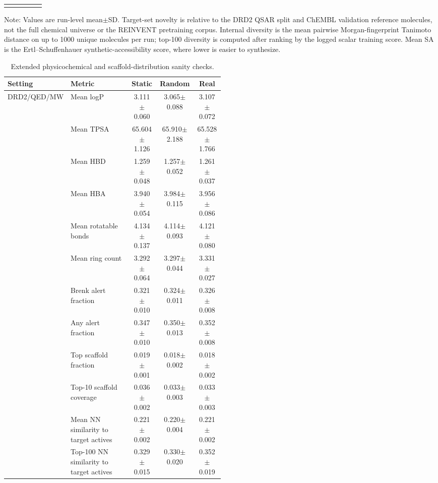 \documentclass[referee,lineno,pdflatex,sn-basic]{sn-jnl}
\theoremstyle{thmstyleone}%
\theoremstyle{thmstyletwo}%
\theoremstyle{thmstylethree}%
\begin{document}
\begin{table}[h]
\begin{tabularx}{\linewidth}{@{}p{0.22\linewidth}p{0.22\linewidth}ccc@{}}
\addlinespace
\botrule
\end{tabularx}
\vspace{2pt}
\raggedright
\footnotesize
Note: Values are run-level mean$\pm$SD. Target-set novelty is relative to the DRD2 QSAR split and ChEMBL validation reference molecules, not the full chemical universe or the REINVENT pretraining corpus. Internal diversity is the mean pairwise Morgan-fingerprint Tanimoto distance on up to 1000 unique molecules per run; top-100 diversity is computed after ranking by the logged scalar training score. Mean SA is the Ertl--Schuffenhauer synthetic-accessibility score, where lower is easier to synthesize.
\end{table}

\begin{table}[h]
\caption{Extended physicochemical and scaffold-distribution sanity checks.}
\label{tab:molecule_quality_extended}
\centering
\footnotesize
\setlength{\tabcolsep}{3pt}
\begin{tabularx}{\linewidth}{@{}p{0.22\linewidth}p{0.28\linewidth}ccc@{}}
\toprule
Setting & Metric & Static & Random & Real\\
\midrule
DRD2/QED/MW & Mean logP & 3.111$\pm$0.060 & 3.065$\pm$0.088 & 3.107$\pm$0.072\\
 & Mean TPSA & 65.604$\pm$1.126 & 65.910$\pm$2.188 & 65.528$\pm$1.766\\
 & Mean HBD & 1.259$\pm$0.048 & 1.257$\pm$0.052 & 1.261$\pm$0.037\\
 & Mean HBA & 3.940$\pm$0.054 & 3.984$\pm$0.115 & 3.956$\pm$0.086\\
 & Mean rotatable bonds & 4.134$\pm$0.137 & 4.114$\pm$0.093 & 4.121$\pm$0.080\\
 & Mean ring count & 3.292$\pm$0.064 & 3.297$\pm$0.044 & 3.331$\pm$0.027\\
 & Brenk alert fraction & 0.321$\pm$0.010 & 0.324$\pm$0.011 & 0.326$\pm$0.008\\
 & Any alert fraction & 0.347$\pm$0.010 & 0.350$\pm$0.013 & 0.352$\pm$0.008\\
 & Top scaffold fraction & 0.019$\pm$0.001 & 0.018$\pm$0.002 & 0.018$\pm$0.002\\
 & Top-10 scaffold coverage & 0.036$\pm$0.002 & 0.033$\pm$0.003 & 0.033$\pm$0.003\\
 & Mean NN similarity to target actives & 0.221$\pm$0.002 & 0.220$\pm$0.004 & 0.221$\pm$0.002\\
 & Top-100 NN similarity to target actives & 0.329$\pm$0.015 & 0.330$\pm$0.020 & 0.352$\pm$0.019\\

\end{tabularx}
\end{table}
\end{document}
